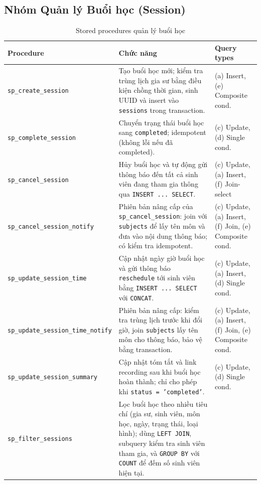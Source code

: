 \subsection{Nhóm Quản lý Buổi học (Session)}

\begin{table}[H]
\centering
\caption{Stored procedures quản lý buổi học}
\label{tab:sp_sessions}
\small
\begin{tabular}{|p{4.5cm}|p{7.5cm}|p{2.5cm}|}
\hline
\textbf{Procedure} & \textbf{Chức năng} & \textbf{Query types} \\
\hline
\texttt{sp\_create\_session} &
  Tạo buổi học mới; kiểm tra trùng lịch gia sư bằng điều kiện chồng thời gian, sinh UUID và insert vào \texttt{sessions} trong transaction. &
  (a) Insert, (e) Composite cond. \\
\hline
\texttt{sp\_complete\_session} &
  Chuyển trạng thái buổi học sang \texttt{completed}; idempotent (không lỗi nếu đã completed). &
  (c) Update, (d) Single cond. \\
\hline
\texttt{sp\_cancel\_session} &
  Hủy buổi học và tự động gửi thông báo đến tất cả sinh viên đang tham gia thông qua \texttt{INSERT ... SELECT}. &
  (c) Update, (a) Insert, (f) Join-select \\
\hline
\texttt{sp\_cancel\_session\_notify} &
  Phiên bản nâng cấp của \texttt{sp\_cancel\_session}: join với \texttt{subjects} để lấy tên môn và đưa vào nội dung thông báo; có kiểm tra idempotent. &
  (c) Update, (a) Insert, (f) Join, (e) Composite cond. \\
\hline
\texttt{sp\_update\_session\_time} &
  Cập nhật ngày giờ buổi học và gửi thông báo \texttt{reschedule} tới sinh viên bằng \texttt{INSERT ... SELECT} với \texttt{CONCAT}. &
  (c) Update, (a) Insert, (d) Single cond. \\
\hline
\texttt{sp\_update\_session\_time\_notify} &
  Phiên bản nâng cấp: kiểm tra trùng lịch trước khi đổi giờ, join \texttt{subjects} lấy tên môn cho thông báo, bảo vệ bằng transaction. &
  (c) Update, (a) Insert, (f) Join, (e) Composite cond. \\
\hline
\texttt{sp\_update\_session\_summary} &
  Cập nhật tóm tắt và link recording sau khi buổi học hoàn thành; chỉ cho phép khi \texttt{status = 'completed'}. &
  (c) Update, (d) Single cond. \\
\hline
\texttt{sp\_filter\_sessions} &
  Lọc buổi học theo nhiều tiêu chí (gia sư, sinh viên, môn học, ngày, trạng thái, loại hình); dùng \texttt{LEFT JOIN}, subquery kiểm tra sinh viên tham gia, và \texttt{GROUP BY} với \texttt{COUNT} để đếm số sinh viên hiện tại. &

\end{tabular}
\end{table}
